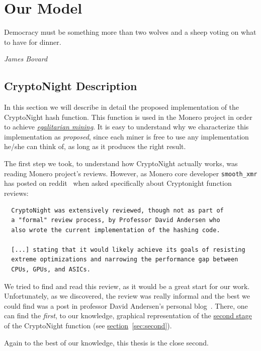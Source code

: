 
\chapter{Our Model} \label{ch:cryptonight}
%
\epigraph{Democracy must be something more than two wolves and a sheep voting on what to have for dinner.}{\textit{James Bovard}}
%
\section{CryptoNight Description}
In this section we will describe in detail the proposed implementation of the CryptoNight hash function. This function is used in the Monero project in order to achieve \hyperref[sec:egalitarian]{\emph{egalitarian mining}}. It is easy to understand why we characterize this implementation as \emph{proposed}, since each miner is free to use any implementation he/she can think of, as long as it produces the right result.

The first step we took, to understand how CryptoNight actually works, was reading Monero project's reviews. However, as Monero core developer \verb|smooth_xmr| has posted on reddit~\cite{reddit} when asked specifically about Cryptonight function reviews:
\begin{verbatim}
  CryptoNight was extensively reviewed, though not as part of
  a "formal" review process, by Professor David Andersen who
  also wrote the current implementation of the hashing code.

  [...] stating that it would likely achieve its goals of resisting
  extreme optimizations and narrowing the performance gap between
  CPUs, GPUs, and ASICs.
\end{verbatim}

We tried to find and read this review, as it would be a great start for our work. Unfortunately, as we discovered, the review was really informal and the best we could find was a post in professor David Andersen's personal blog~\cite{andersen}. There, one can find the \emph{first}, to our knowledge, graphical representation of the \hyperref[sec:second]{second stage} of the CryptoNight function (see \hyperref[sec:second]{section}~\ref{sec:second}).

Again to the best of our knowledge, this thesis is the close second.

